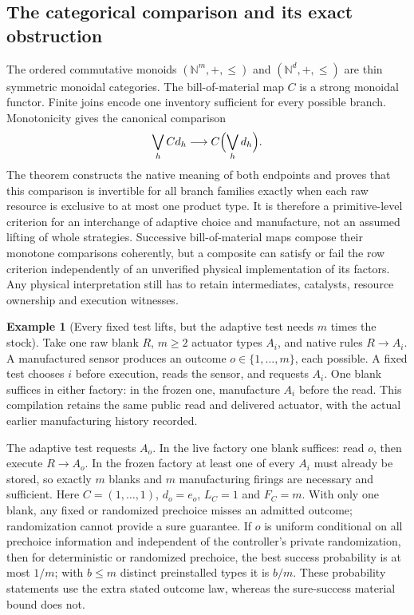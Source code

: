 \documentclass[11pt]{article}
\theoremstyle{definition}
\newtheorem{example}[theorem]{Example}
\theoremstyle{remark}
\begin{document}
\subsection{The categorical comparison and its exact obstruction}
The ordered commutative monoids $(\mathbb N^m,+,\le)$ and
$(\mathbb N^d,+,\le)$ are thin symmetric monoidal categories. The
bill-of-material map $C$ is a strong monoidal functor. Finite joins encode
one inventory sufficient for every possible branch. Monotonicity gives
the canonical comparison
\[
 \bigvee_h C d_h\longrightarrow C\Bigl(\bigvee_h d_h\Bigr).
\]
The theorem constructs the native meaning of both endpoints and proves
that this comparison is invertible for all branch families exactly when
each raw resource is exclusive to at most one product type. It is
therefore a primitive-level criterion for an interchange of adaptive
choice and manufacture, not an assumed lifting of whole strategies.
Successive bill-of-material maps compose their monotone comparisons
coherently, but a composite can satisfy or fail the row criterion
independently of an unverified physical implementation of its factors.
Any physical interpretation still has to retain intermediates, catalysts,
resource ownership and execution witnesses.

\begin{example}[Every fixed test lifts, but the adaptive test needs $m$ times the stock]
\label{arc:gap}
Take one raw blank $R$, $m\ge2$ actuator types $A_i$, and native rules
$R\to A_i$. A manufactured sensor produces an outcome
$o\in\{1,\ldots,m\}$, each possible. A fixed test chooses $i$ before
execution, reads the sensor, and requests $A_i$. One blank suffices in
either factory: in the frozen one, manufacture $A_i$ before the read.
This compilation retains the same public read and delivered actuator,
with the actual earlier manufacturing history recorded.

The adaptive test requests $A_o$. In the live factory one blank suffices:
read $o$, then execute $R\to A_o$. In the frozen factory at least one of
every $A_i$ must already be stored, so exactly $m$ blanks and $m$
manufacturing firings are necessary and sufficient. Here
$C=(1,\ldots,1)$, $d_o=e_o$, $L_C=1$ and $F_C=m$.
With only one blank, any fixed or randomized prechoice misses an admitted
outcome; randomization cannot provide a sure guarantee. If $o$ is uniform conditional on all prechoice information and independent
of the controller's private randomization, then for deterministic
or randomized prechoice, the best success
probability is at most $1/m$; with $b\le m$ distinct preinstalled types
it is $b/m$. These probability statements use the extra stated outcome
law, whereas the sure-success material bound does not.
\end{example}
\end{document}
